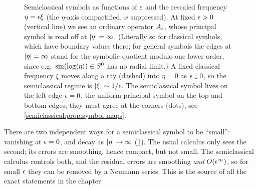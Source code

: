 \begin{figure}[ht]
\centering
{}
\caption{Semiclassical symbols as functions of $\epsilon$ and the rescaled
frequency $\eta=\epsilon\xi$ (the $\eta$-axis compactified, $x$ suppressed). At
fixed $\epsilon>0$ (vertical line) we see an ordinary operator $A_\epsilon$, whose
principal symbol is read off at $\lvert \eta\rvert=\infty$. (Literally so for classical
symbols, which have boundary values there; for general symbols the edges at
$\lvert \eta\rvert=\infty$ stand for the symbolic quotient modulo one lower order, since e.g.\
$\sin(\log\langle \eta\rangle)\in S^0$ has no radial limit.) A fixed classical
frequency $\xi$ moves along a ray (dashed) into $\eta=0$ as $\epsilon\downarrow0$,
so the semiclassical regime is $\lvert \xi\rvert\sim1/\epsilon$. The semiclassical symbol
lives on the left edge $\epsilon=0$, the uniform principal symbol on the top and
bottom edges; they must agree at the corners (dots), see
\cref{semiclassical:prop:symbol-maps}.}
\label{semiclassical:fig:regimes}
\end{figure}

\begin{discussion}
There are two independent ways for a semiclassical symbol to be ``small'':
vanishing at $\epsilon=0$, and decay as $\lvert \eta\rvert\to\infty$
(\cref{semiclassical:fig:regimes}). The usual calculus only sees the second;
its errors are smoothing, hence compact, but not small. The semiclassical
calculus controls both, and the residual errors are smoothing \emph{and}
$O(\epsilon^\infty)$, so for small $\epsilon$ they can be removed by a Neumann series.
This is the source of all the exact statements in the chapter.
\end{discussion}

